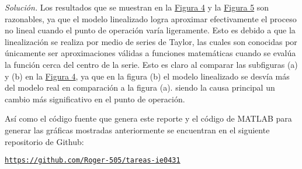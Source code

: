 \textit{Solución.} Los resultados que se muestran en la \hyperref[fig4]{Figura 4} y la \hyperref[fig5]{Figura 5} son razonables, ya que el modelo linealizado logra aproximar efectivamente el proceso no lineal cuando el punto de operación varía ligeramente. Esto es debido a que la linealización se realiza por medio de series de Taylor, las cuales son conocidas por únicamente ser aproximaciones válidas a funciones matemáticas cuando se evalúa la función cerca del centro de la serie. Esto es claro al comparar las subfiguras (a) y (b) en la \hyperref[fig4]{Figura 4}, ya que en la figura (b) el modelo linealizado se desvía más del modelo real en comparación a la figura (a). siendo la causa principal un cambio más significativo en el punto de operación.


\vspace{1em}
\begin{mdframed}
        Así como el código fuente que genera este reporte y el código de MATLAB para generar las gráficas mostradas anteriormente se encuentran en el siguiente repositorio de Github:
    
    \begin{center}
        \href{https://github.com/Roger-505/tareas-ie0431}{\texttt{https://github.com/Roger-505/tareas-ie0431}}
    \end{center}
\end{mdframed}
